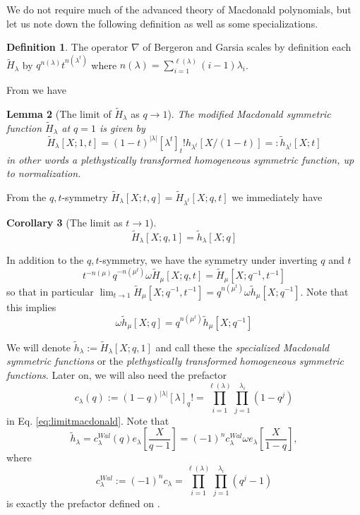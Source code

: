\documentclass{amsart}
\numberwithin{equation}{section}
\newtheorem{lemma}{Lemma}[section]
\newtheorem{corollary}[lemma]{Corollary}%
\theoremstyle{definition}
\newtheorem{definition}[lemma]{Definition}%
\def\tilde{\widetilde}
\newcommand{\tH}{\widetilde{H}}
\renewcommand{\th}{\tilde{h}}
\begin{document}
We do not require much of the advanced theory of Macdonald polynomials, but let us note down the following definition as well as some specializations.
\begin{definition}
\label{def:nablaoperator} 
The operator $\nabla$ of Bergeron and Garsia scales by definition each $\tH_\lambda$ by $q^{n(\lambda)}t^{n(\lambda^t)}$ where $n(\lambda)=\sum_{i=1}^{\ell(\lambda)}(i-1)\lambda_i$.
\end{definition}
From \cite[Proposition 3.5.8.]{HaimanCDM} we have
\begin{lemma}[The limit of $\tH_\lambda$ as $q\to 1$]	
\label{lem:plethhomog}
The modified Macdonald symmetric function $\tH_\lambda$ at $q=1$ is given by
\begin{equation}
\label{eq:limitmacdonald}\tH_\lambda[X;1,t]=(1-t)^{|\lambda|}[\lambda^t]_t!h_{\lambda^t}[X/(1-t)]=:\th_{\lambda^t}[X;t]
\end{equation}
in other words a plethystically transformed homogeneous symmetric function, up to normalization. 
\end{lemma}
From the $q,t$-symmetry $\tH_\lambda[X;t,q]=\tH_{\lambda^t}[X;q,t]$ we immediately have
\begin{corollary}[The limit as $t\to 1$]\label{cor:tHlambda}
$$\tH_\lambda[X;q,1]=\th_\lambda[X;q]$$
\end{corollary}
In addition to the $q,t$-symmetry, we have the symmetry under inverting $q$ and $t$ \cite[Proposition 3.5.12.]{HaimanCDM}
\begin{equation}
\label{eq:invertqt}
t^{-n(\mu)}q^{-n(\mu^t)}\omega \tH_\mu[X;q,t]=\tH_\mu[X;q^{-1},t^{-1}]
\end{equation}
so that in particular $\lim_{t\to 1}\tH_\mu[X;q^{-1},t^{-1}]=q^{n(\mu^t)}\omega\th_\mu[X;q^{-1}]$. Note that this implies 
\begin{equation}
\label{eq:invertq}
\omega\th_\mu[X;q]=q^{n(\mu^t)}\th_\mu[X;q^{-1}]
\end{equation}

We will denote $\th_\lambda:=\tH_\lambda[X;q,1]$ and call these the {\em specialized Macdonald symmetric functions} or the {\em plethystically transformed homogeneous symmetric functions}.  Later on, we will also need the prefactor
\begin{equation}
\label{eq:ccoeff}
c_\lambda(q):=(1-q)^{|\lambda|}[\lambda]_q!=\prod_{i=1}^{\ell(\lambda)}\prod_{j=1}^{\lambda_i}(1-q^j)
\end{equation}
in Eq. \eqref{eq:limitmacdonald}. Note that 
$$\th_\lambda=c_\lambda^{Wal}(q)e_\lambda\left[\frac{X}{q-1}\right]=(-1)^n c_\lambda^{Wal}\omega e_\lambda\left[\frac{X}{1-q}\right],$$ where 
\begin{equation}
\label{eq:ccoeffwal}
c_\lambda^{Wal}:=(-1)^nc_\lambda=\prod_{i=1}^{\ell(\lambda)}\prod_{j=1}^{\lambda_i}(q^j-1)
\end{equation}
is exactly the prefactor defined on \cite[pp. 201]{W1}.
\end{document}
